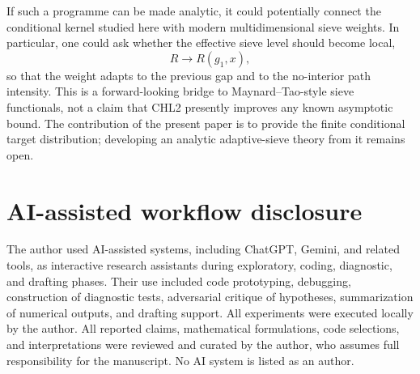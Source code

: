 \documentclass[10pt]{article}
\begin{document}
If such a programme can be made analytic, it could potentially connect the conditional kernel studied here with modern multidimensional sieve weights.  In particular, one could ask whether the effective sieve level should become local,
\[
R\longrightarrow R(g_1,x),
\]
so that the weight adapts to the previous gap and to the no-interior path intensity.  This is a forward-looking bridge to Maynard--Tao-style sieve functionals, not a claim that CHL2 presently improves any known asymptotic bound.  The contribution of the present paper is to provide the finite conditional target distribution; developing an analytic adaptive-sieve theory from it remains open.

\section{AI-assisted workflow disclosure}
The author used AI-assisted systems, including ChatGPT, Gemini, and related tools, as interactive research assistants during exploratory, coding, diagnostic, and drafting phases.  Their use included code prototyping, debugging, construction of diagnostic tests, adversarial critique of hypotheses, summarization of numerical outputs, and drafting support.  All experiments were executed locally by the author.  All reported claims, mathematical formulations, code selections, and interpretations were reviewed and curated by the author, who assumes full responsibility for the manuscript.  No AI system is listed as an author.
\end{document}
